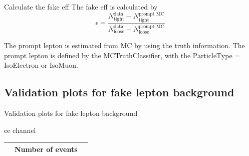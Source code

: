 \documentclass[mathserif,serif]{beamer}
\begin{document}
\begin{frame}{Calculate the fake eff}
The fake eff is calculated by
\begin{equation*}
\epsilon = \frac{N^{\text{data}}_{\text{tight}} - N^{\text{prompt MC}}_{\text{tight}}}{N^{\text{data}}_{\text{loose}} - N^{\text{prompt MC}}_{\text{loose}}}
\end{equation*}

The prompt lepton is estimated from MC by using the truth information. The prompt lepton is defined by the MCTruthClassifier, with the ParticleType = IsoElectron or IsoMuon.
\end{frame}

\subsection{Validation plots for fake lepton background}
\begin{frame}
\begin{center}
\huge
Validation plots for fake lepton background
\end{center}
\end{frame}

\begin{frame}{ee channel}
\vspace{5mm}
\begin{tabular}{|c|c|c|}
\hline
& Number of events & \\
\hline

\end{tabular}
\end{frame}
\end{document}
